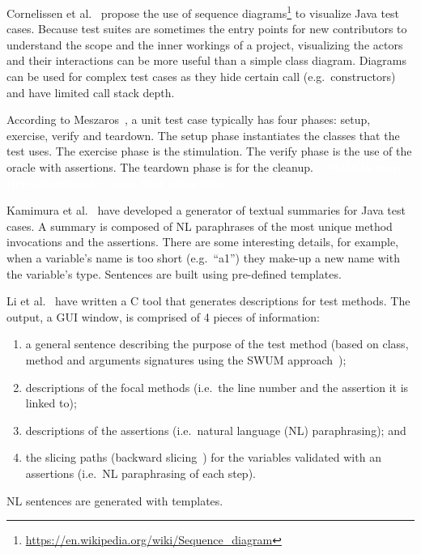 \documentclass[11pt]{sdm_internship}
\newcommand{\CS}{C\nolinebreak\hspace{-.05em}\raisebox{.6ex}{\scriptsize\bf \#}}
\newcommand{\todo}[1]{\colorbox{Red!75}{\textcolor{white}{\textbf{TODO\ifx&#1&\else: #1\fi}}}}
\newcommand{\rephrase}[1]{\colorbox{BlueViolet!60}{\textcolor{white}{\textbf{$\sim$#1}}}}
\theoremstyle{definition}
\begin{document}
Cornelissen et al.~\cite{cornelissen2007visualizing} propose the use of sequence diagrams\footnote{\url{https://en.wikipedia.org/wiki/Sequence_diagram}} to visualize Java test cases.
Because test suites are sometimes the entry points for new contributors to understand the scope and the inner workings of a project, visualizing the actors and their interactions can be more useful than a simple class diagram.
Diagrams can be used for complex test cases as they hide certain call (e.g.\ constructors) and have limited call stack depth.

According to Meszaros~\cite{meszaros2007xunit}, a unit test case typically has four phases: setup, exercise, verify and teardown.
The setup phase instantiates the classes that the test uses.
The exercise phase is the stimulation.
The verify phase is the use of the oracle with assertions.
The teardown phase is for the cleanup.\rephrase{}
\todo{move that elsewhere}

Kamimura et al.~\cite{kamimura2013towards} have developed a generator of textual summaries for Java test cases.
A summary is composed of NL paraphrases of the most unique method invocations and the assertions.
There are some interesting details, for example, when a variable's name is too short (e.g.\ ``a1'') they make-up a new name with the variable's type.
Sentences are built using pre-defined templates.

Li et al.~\cite{li2016automatically} have written a \CS{} tool that generates descriptions for test methods.
The output, a GUI window, is comprised of 4 pieces of information:
\begin{enumerate}
  \item a general sentence describing the purpose of the test method (based on class, method and arguments signatures using the SWUM approach~\cite{herbert2016swummary});
  \item descriptions of the focal methods (i.e.\ the line number and the assertion it is linked to);
  \item descriptions of the assertions (i.e.\ natural language (NL) paraphrasing); and
  \item the slicing paths (backward slicing~\cite{jhala2005path}) for the variables validated with an assertions (i.e.\ NL paraphrasing of each step).
\end{enumerate}
NL sentences are generated with templates.
\end{document}
